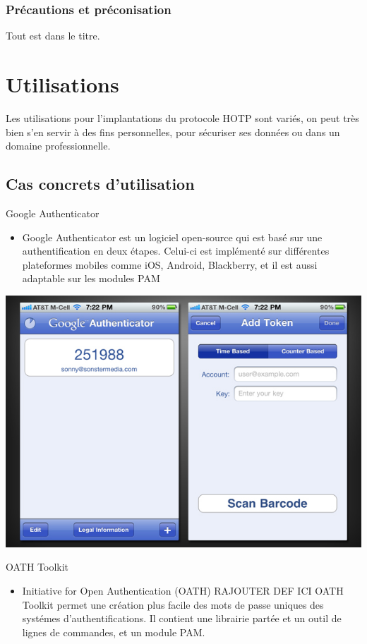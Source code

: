\documentclass{../res/univ-projet}
\begin{document}
    \subsubsection{Précautions et préconisation}
    Tout est dans le titre.
    
\section{Utilisations}
Les utilisations pour l'implantations du protocole HOTP sont vari\'{e}s, on peut très bien s'en servir \`{a} des fins personnelles, pour s\'{e}curiser ses donn\'{e}es ou dans un domaine professionnelle.
  \subsection{Cas concrets d'utilisation}
  Google Authenticator
  \begin{itemize}
    \item Google Authenticator est un logiciel open-source qui est bas\'{e} sur une authentification en deux 		\'{e}tapes. Celui-ci est impl\'{e}ment\'{e} sur diff\'{e}rentes plateformes mobiles comme iOS, Android, 		Blackberry, et il est aussi adaptable sur les modules PAM
  \end{itemize}
  \includegraphics[scale=0.5]{GoogleAuthenticator_2.jpg}
  
  OATH Toolkit
  \begin{itemize}
    \item Initiative for Open Authentication (OATH) RAJOUTER DEF ICI OATH Toolkit permet une cr\'{e}ation plus facile des mots de passe uniques des syst\'{e}mes d'authentifications. Il contient 
    une librairie part\'{e}e et un outil de lignes de commandes, et un module PAM.
  \end{itemize}
  
\end{document}
